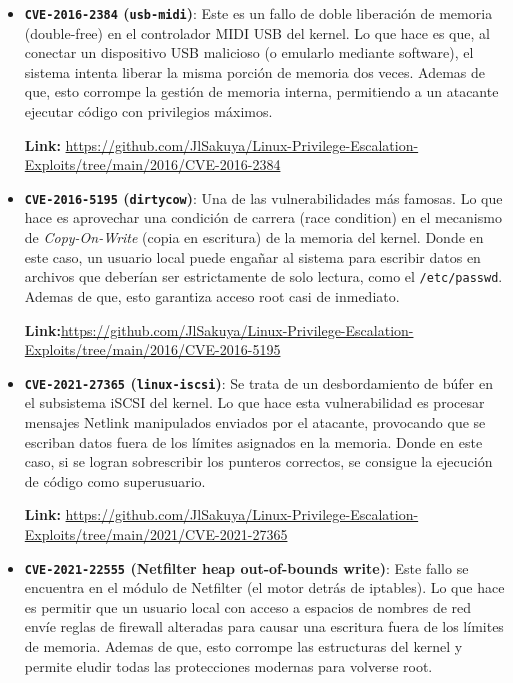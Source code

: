 \documentclass[letterpaper,11pt]{article}
\begin{document}
\begin{itemize}
  \textbf{Link:} \url{https://github.com/JlSakuya/Linux-Privilege-Escalation-Exploits/tree/main/2016/CVE-2016-0728}

  \item \textbf{\texttt{CVE-2016-2384} (\texttt{usb-midi})}: Este es un fallo de doble liberación de memoria (double-free) en el controlador MIDI USB del kernel. Lo que hace es que, al conectar un dispositivo USB malicioso (o emularlo mediante software), el sistema intenta liberar la misma porción de memoria dos veces. Ademas de que, esto corrompe la gestión de memoria interna, permitiendo a un atacante ejecutar código con privilegios máximos.

  \textbf{Link:} \url{https://github.com/JlSakuya/Linux-Privilege-Escalation-Exploits/tree/main/2016/CVE-2016-2384}

  \item \textbf{\texttt{CVE-2016-5195} (\texttt{dirtycow})}: Una de las vulnerabilidades más famosas. Lo que hace es aprovechar una condición de carrera (race condition) en el mecanismo de \textit{Copy-On-Write} (copia en escritura) de la memoria del kernel. Donde en este caso, un usuario local puede engañar al sistema para escribir datos en archivos que deberían ser estrictamente de solo lectura, como el \texttt{/etc/passwd}. Ademas de que, esto garantiza acceso root casi de inmediato.

  \textbf{Link:}\url{https://github.com/JlSakuya/Linux-Privilege-Escalation-Exploits/tree/main/2016/CVE-2016-5195}

  \item \textbf{\texttt{CVE-2021-27365} (\texttt{linux-iscsi})}: Se trata de un desbordamiento de búfer en el subsistema iSCSI del kernel. Lo que hace esta vulnerabilidad es procesar mensajes Netlink manipulados enviados por el atacante, provocando que se escriban datos fuera de los límites asignados en la memoria. Donde en este caso, si se logran sobrescribir los punteros correctos, se consigue la ejecución de código como superusuario.
  
  \textbf{Link:} \url{https://github.com/JlSakuya/Linux-Privilege-Escalation-Exploits/tree/main/2021/CVE-2021-27365}

  \item \textbf{\texttt{CVE-2021-22555} (Netfilter heap out-of-bounds write)}: Este fallo se encuentra en el módulo de Netfilter (el motor detrás de iptables). Lo que hace es permitir que un usuario local con acceso a espacios de nombres de red envíe reglas de firewall alteradas para causar una escritura fuera de los límites de memoria. Ademas de que, esto corrompe las estructuras del kernel y permite eludir todas las protecciones modernas para volverse root.
  

\end{itemize}
\end{document}

